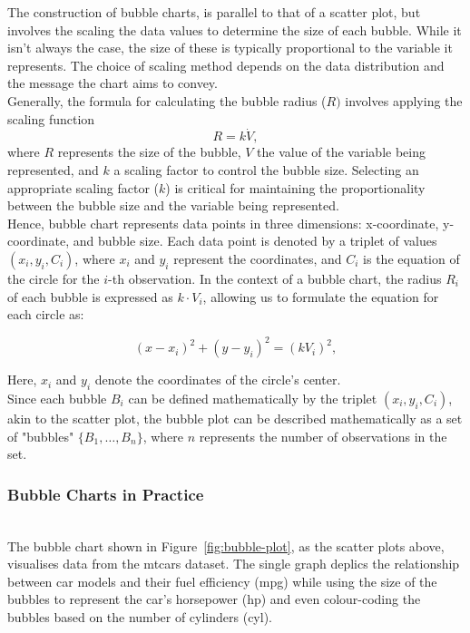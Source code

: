 \documentclass{article}\usepackage[]{graphicx}\usepackage[]{xcolor}
\numberwithin{equation}{section}
\begin{document}
\noindent The construction of bubble charts, is parallel to that of a scatter plot, but involves the scaling the data values to determine the size of each bubble. While it isn't always the case, the size of these is typically proportional to the variable it represents. The choice of scaling method depends on the data distribution and the message the chart aims to convey.\\

\noindent Generally, the formula for calculating the bubble radius (\(R)\) involves applying the scaling function
\[
R = k \dot V,
\]
\noindent where \(R\) represents the size of the bubble, \(V\) the value of the variable being represented, and \(k\) a scaling factor to control the bubble size. Selecting an appropriate scaling factor (\(k\)) is critical for maintaining the proportionality between the bubble size and the variable being represented.\\ 

\noindent Hence, bubble chart represents data points in three dimensions: x-coordinate, y-coordinate, and bubble size. Each data point is denoted by a triplet of values \((x_i, y_i, C_i)\), where \(x_i\) and \(y_i\) represent the coordinates, and \(C_i\) is the equation of the circle for the \(i\)-th observation. In the context of a bubble chart, the radius \(R_i\) of each bubble is expressed as \(k \cdot V_i\), allowing us to formulate the equation for each circle as:

\[
(x - x_i)^2 + (y - y_i)^2 = (kV_i)^2 ,
\]

\noindent Here, \(x_i\) and \(y_i\) denote the coordinates of the circle's center.\\

\noindent Since each bubble \(B_i\) can be defined mathematically by the triplet \((x_i, y_i, C_i)\), akin to the scatter plot, the bubble plot can be described mathematically as a set of "bubbles" \( \{B_1, \ldots, B_n\}\), where \(n\) represents the number of observations in the set.\\

\noindent
\subsubsection{Bubble Charts in Practice}\\

\noindent The bubble chart shown in Figure~\ref{fig:bubble-plot}, as the scatter plots above, visualises data from the mtcars dataset. The single graph deplics the relationship between car models and their fuel efficiency (mpg) while using the size of the bubbles to represent the car's horsepower (hp) and even colour-coding the bubbles based on the number of cylinders (cyl).\\
\end{document}
